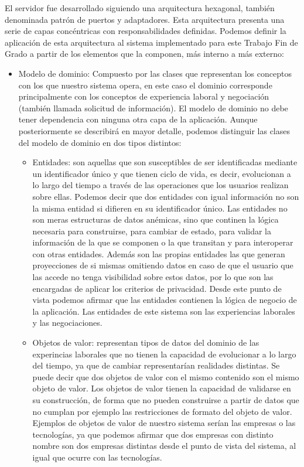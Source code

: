 \documentclass[a4paper, 12pt]{book}
\begin{document}
El servidor fue desarrollado siguiendo una arquitectura hexagonal, también denominada patrón de puertos y adaptadores. Esta arquitectura presenta una serie de capas concéntricas con responsabilidades definidas.
Podemos definir la aplicación de esta arquitectura al sistema implementado para este Trabajo Fin de Grado a partir de los elementos que la componen, más interno a más externo:

\begin{itemize}
\item Modelo de dominio: Compuesto por las clases que representan los conceptos con los que nuestro sistema opera, en este caso el dominio corresponde principalmente con los conceptos de experiencia laboral y negociación (también llamada solicitud de información). 
El modelo de dominio no debe tener dependencia con ninguna otra capa de la aplicación.
Aunque posteriormente se describirá en mayor detalle, podemos distinguir las clases del modelo de dominio en dos tipos distintos:

	\begin{itemize}
	 \item Entidades: son aquellas que son susceptibles de ser identificadas mediante un identificador único y que tienen ciclo de vida, es decir, evolucionan a lo largo del tiempo a través de las operaciones que los usuarios realizan sobre ellas. 
	Podemos decir que dos entidades con igual información no son la misma entidad si difieren en su identificador único.
	Las entidades no son meras estructuras de datos anémicas, sino que continen la lógica necesaria para construirse, para cambiar de estado, para validar la información de la que se componen o la que transitan y para interoperar con otras entidades.
	Además son las propias entidades las que generan proyecciones de si mismas omitiendo datos en caso de que el usuario que las accede no tenga visibilidad sobre estos datos, por lo que son las encargadas de aplicar los criterios de privacidad.
	Desde este punto de vista podemos afirmar que las entidades contienen la lógica de negocio de la aplicación.
	Las entidades de este sistema son las experiencias laborales y las negociaciones.
	\item Objetos de valor: representan tipos de datos del dominio de las experincias laborales que no tienen la capacidad de evolucionar a lo largo del tiempo, ya que de cambiar representarían realidades distintas. Se puede decir que dos objetos de valor con el mismo contenido son el mismo objeto de valor.
	Los objetos de valor tienen la capacidad de validarse en su construcción, de forma que no pueden construirse a partir de datos que no cumplan por ejemplo las restricciones de formato del objeto de valor. 
	Ejemplos de objetos de valor de nuestro sistema serían las empresas o las tecnologías, ya que podemos afirmar que dos empresas con distinto nombre son dos empresas distintas desde el punto de vista del sistema, al igual que ocurre con las tecnologías.
	\end{itemize}
  

\end{itemize}
\end{document}
